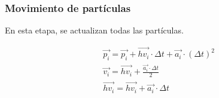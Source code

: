\subsubsection{Movimiento de partículas}

En esta etapa, se actualizan todas las partículas.

\[
\begin{split}
&\vec{p_i} = \vec{p_i} + \overrightarrow{hv_i} \cdot \Delta t + \vec{a_i} \cdot (\Delta t)^2\\
&\vec{v_i} = \overrightarrow{hv_i} + \frac{\vec{a_i} \cdot \Delta t}{2}\\
&\overrightarrow{hv_i} = \overrightarrow{hv_i} + \vec{a_i} \cdot \Delta t
\end{split}
\]
